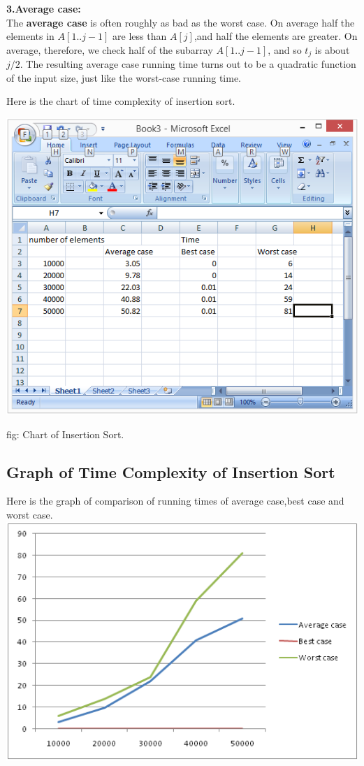 \documentclass[12 pt,a4paper]{report}
\begin{document}
\textbf{3.Average  case:}\\

The \textbf{average case} is often roughly as bad as the worst case. On average half the elements in $A[1..j-1]$ are less than $A[j]$,and half the elements are greater. On average, therefore, we check half of the subarray $A[1..j-1]$, and so $t_j$ is about $j/2$. The resulting average case running time turns out to be a quadratic function of the input size, just like the worst-case running time.

Here is the chart of time complexity of insertion sort.

\vspace{1cm}

\includegraphics{insertdata.png}

\hspace{5cm}fig: Chart of Insertion Sort.

\subsection{Graph of Time Complexity of Insertion Sort}

Here is the graph of  comparison of running times of average case,best case and worst case.\\


\includegraphics{img-1.png}
\end{document}
